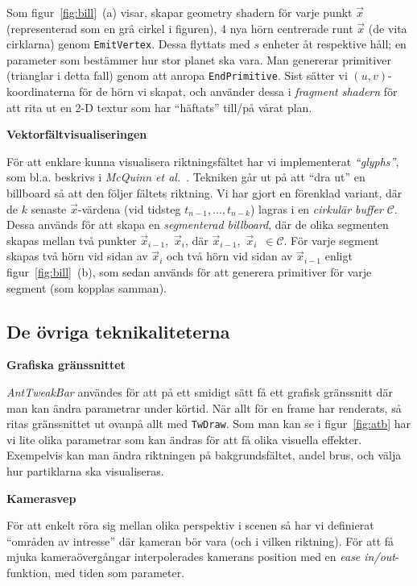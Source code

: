 \documentclass[a4paper]{article}
\begin{document}
\begin{multicols}{2}
Som figur~\ref{fig:bill}~(a) visar, skapar geometry shadern för varje punkt \(\vec{x}\) (representerad som en grå cirkel i figuren), 4 nya hörn centrerade runt \(\vec{x}\) (de vita cirklarna) genom \texttt{EmitVertex}. Dessa flyttats med \(s\) enheter åt respektive håll; en parameter som bestämmer hur stor planet ska vara. Man genererar primitiver (trianglar i detta fall) genom att anropa \texttt{EndPrimitive}. Sist sätter vi \((u, v)\)-koordinaterna för de hörn vi skapat, och använder dessa i \emph{fragment shadern} för att rita ut en 2-D textur som har ``häftats'' till/på vårat plan.

\textbf{Vektorfältvisualiseringen}

För att enklare kunna visualisera riktningsfältet har vi implementerat \emph{``glyphs''}, som bl.a. beskrivs i \emph{McQuinn et al.}~\cite{mcquinn2013glyphsea}. Tekniken går ut på att ``dra ut'' en billboard så att den följer fältets riktning. Vi har gjort en förenklad variant, där de \(k\) senaste \(\vec{x}\)-värdena (vid tidsteg \(t_{n-1}, ..., t_{n-k}\)) lagras i en \emph{cirkulär buffer} \(\mathcal{C}\). Dessa används för att skapa en \emph{segmenterad billboard}, där de olika segmenten skapas mellan två punkter \(\vec{x}_{i-1}\),~\(\vec{x}_i\), där \(\vec{x}_{i-1}\),~\(\vec{x}_i\)~\(\in \mathcal{C}\). För varje segment skapas två hörn vid sidan av \(\vec{x}_i\) och två hörn vid sidan av \(\vec{x}_{i-1}\) enligt figur~\ref{fig:bill}~(b), som sedan används för att generera primitiver för varje segment (som kopplas samman).

\subsection{De övriga teknikaliteterna}

\textbf{Grafiska gränssnittet}

\textit{AntTweakBar} användes för att på ett smidigt sätt få ett grafisk gränssnitt där man kan ändra parametrar under körtid. När allt för en frame har renderats, så ritas gränssnittet ut ovanpå allt med \texttt{TwDraw}. Som man kan se i figur~\ref{fig:atb} har vi lite olika parametrar som kan ändras för att få olika visuella effekter. Exempelvis kan man ändra riktningen på bakgrundsfältet, andel brus, och välja hur partiklarna ska visualiseras.

\textbf{Kamerasvep}

För att enkelt röra sig mellan olika perspektiv i scenen så har vi definierat ``områden av intresse'' där kameran bör vara (och i vilken riktning).  För att få mjuka kameraövergångar interpolerades kamerans position med en \emph{ease in/out}-funktion, med tiden som parameter.


\end{multicols}
\end{document}
